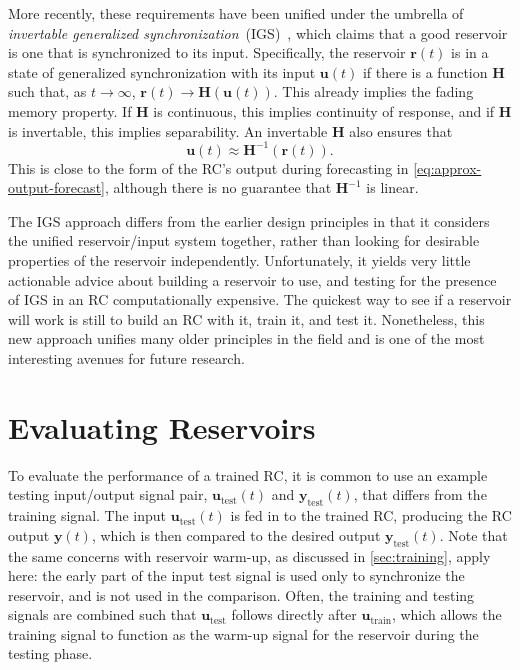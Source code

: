 More recently, these requirements have been unified under the umbrella
of \emph{invertable generalized
  synchronization}~(IGS)~\cite{lu2018,lymburn2019,lu2020}, which claims that
a good reservoir is one that is synchronized to its
input. Specifically, the reservoir $\bm{r}(t)$ is in a state of
generalized synchronization with its input $\bm{u}(t)$ if there is a
function $\bm{H}$ such that, as $t \rightarrow \infty$, $\bm{r}(t)
\rightarrow \bm{H}\left(\bm{u}(t)\right)$. This already implies the
fading memory property. If $\bm{H}$ is continuous, this implies continuity of response, and if $\bm{H}$ is invertable, this implies separability. An invertable $\bm{H}$ also ensures that
\begin{equation}
  \bm{u}(t) \approx \bm{H}^{-1}\left(\bm{r}(t)\right).
\end{equation}
This is close to the form of the RC's output during forecasting in
\cref{eq:approx-output-forecast}, although there is no guarantee that
$\bm{H}^{-1}$ is linear.

The IGS approach differs from the earlier design principles in that it
considers the unified reservoir/input system together, rather than
looking for desirable properties of the reservoir
independently. Unfortunately, it yields very little actionable advice
about building a reservoir to use, and testing for the presence of IGS
in an RC computationally expensive. The quickest way to see if a
reservoir will work is still to build an RC with it, train it, and
test it. Nonetheless, this new approach unifies many older principles
in the field and is one of the most interesting avenues for future
research.

\section{Evaluating Reservoirs}

To evaluate the performance of a trained RC, it is common to use an
example testing input/output signal pair, $\bm{u}_\text{test}(t)$ and
$\bm{y}_\text{test}(t)$, that differs from the training signal. The
input $\bm{u}_\text{test}(t)$ is fed in to the trained RC, producing
the RC output $\bm{y}(t)$, which is then compared to the desired
output $\bm{y}_\text{test}(t)$. Note that the same concerns with
reservoir warm-up, as discussed in \cref{sec:training}, apply here: the
early part of the input test signal is used only to synchronize the
reservoir, and is not used in the comparison. Often, the training and
testing signals are combined such that $\bm{u}_\text{test}$ follows
directly after $\bm{u}_\text{train}$, which allows the training signal
to function as the warm-up signal for the reservoir during the testing
phase.

